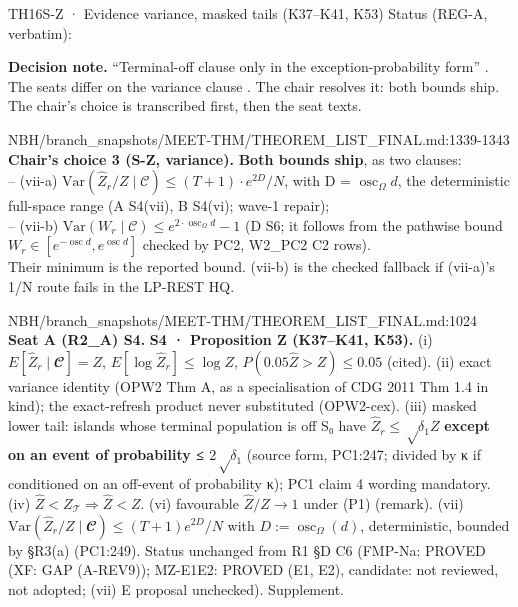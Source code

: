 \begin{card}{TH16}{S-Z · Evidence variance, masked tails (K37–K41, K53)}
\approvedFB\quad Status (REG-A, verbatim):  

\textbf{Decision note.} ``Terminal-off clause only in the exception-probability form'' . The seats differ on the variance clause . The chair resolves it: both bounds ship. The chair's choice is transcribed first, then the seat texts.

\begin{stmt}{NBH/branch_snapshots/MEET-THM/THEOREM_LIST_FINAL.md:1339-1343}
\textbf{Chair's choice 3 (S-Z, variance).} \textbf{Both bounds ship}, as two clauses:\\
– (vii-a) $\mathrm{Var}(\hat{Z}_r/Z \mid 𝒞) ≤ (T+1)\cdot e^{2D}/N$, with D = $\operatorname{osc}_Ω d$, the deterministic full-space range (A S4(vii), B S4(vi); wave-1 repair);\\
– (vii-b) $\mathrm{Var}(W_r \mid 𝒞) ≤ e^{2\cdot\operatorname{osc}_Ω d} − 1$ (D S6; it follows from the pathwise bound $W_r ∈ [e^{−\operatorname{osc} d}, e^{\operatorname{osc} d}]$ checked by PC2, W2\_PC2 C2 rows).\\
Their minimum is the reported bound. (vii-b) is the checked fallback if (vii-a)'s 1/N route fails in the LP-REST HQ.
\end{stmt}

\begin{stmt}{NBH/branch_snapshots/MEET-THM/THEOREM_LIST_FINAL.md:1024}
\textbf{Seat A (R2\_A) S4.} \textbf{S4 · Proposition Z (K37–K41, K53).} (i) $E[\hat{Z}_r \mid 𝓒] = Z$, $E[\log \hat{Z}_r] ≤ \log Z$, $P(0.05\hat{Z} > Z) ≤ 0.05$ (cited). (ii) exact variance identity (OPW2 Thm A, as a specialisation of CDG 2011 Thm 1.4 in kind); the exact-refresh product never substituted (OPW2-cex). (iii) masked lower tail: islands whose terminal population is off S₀ have $\hat{Z}_r ≤ √δ_1 Z$ \textbf{except on an event of probability ≤ $2√δ_1$} (source form, PC1:247; divided by κ if conditioned on an off-event of probability κ); PC1 claim 4 wording mandatory. (iv) $\hat{Z} < Z_{𝒯} ⇒ \hat{Z} < Z$. (vi) favourable $\hat{Z}/Z → 1$ under (P1) (remark). (vii) $\mathrm{Var}(\hat{Z}_r/Z \mid 𝓒) ≤ (T+1)e^{2D}/N$ with $D := \operatorname{osc}_Ω(d)$, deterministic, bounded by §R3(a) (PC1:249). Status unchanged from R1 §D C6 (FMP-Na: PROVED (XF: GAP (A-REV9)); MZ-E1E2: PROVED (E1, E2), candidate: not reviewed, not adopted; (vii) E proposal unchecked). Supplement.
\end{stmt}


\end{card}
